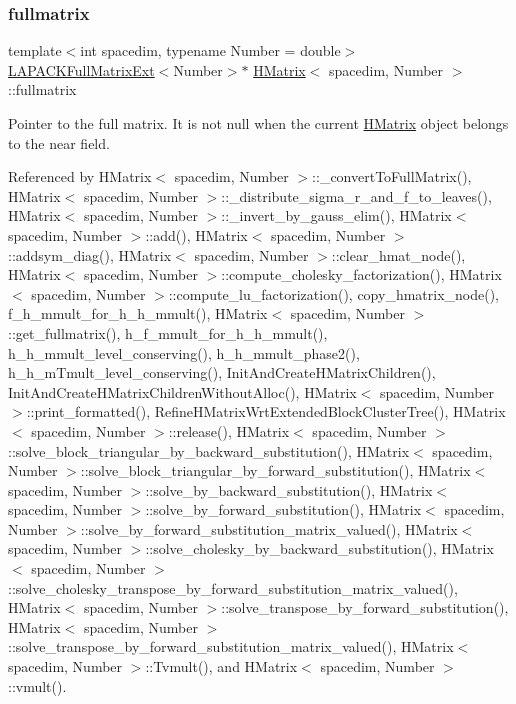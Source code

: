 \mbox{\label{classHMatrix_a328134c9e9cb2c4b05d5431c0ca8a533}} 
\subsubsection{\texorpdfstring{fullmatrix}{fullmatrix}}
{\footnotesize\ttfamily template$<$int spacedim, typename Number = double$>$ \\
\hyperlink{classLAPACKFullMatrixExt}{L\+A\+P\+A\+C\+K\+Full\+Matrix\+Ext}$<$Number$>$$\ast$ \hyperlink{classHMatrix}{H\+Matrix}$<$ spacedim, Number $>$\+::fullmatrix\hspace{0.3cm}{\ttfamily [private]}}

Pointer to the full matrix. It is not null when the current \hyperlink{classHMatrix}{H\+Matrix} object belongs to the near field. 

Referenced by H\+Matrix$<$ spacedim, Number $>$\+::\+\_\+convert\+To\+Full\+Matrix(), H\+Matrix$<$ spacedim, Number $>$\+::\+\_\+distribute\+\_\+sigma\+\_\+r\+\_\+and\+\_\+f\+\_\+to\+\_\+leaves(), H\+Matrix$<$ spacedim, Number $>$\+::\+\_\+invert\+\_\+by\+\_\+gauss\+\_\+elim(), H\+Matrix$<$ spacedim, Number $>$\+::add(), H\+Matrix$<$ spacedim, Number $>$\+::addsym\+\_\+diag(), H\+Matrix$<$ spacedim, Number $>$\+::clear\+\_\+hmat\+\_\+node(), H\+Matrix$<$ spacedim, Number $>$\+::compute\+\_\+cholesky\+\_\+factorization(), H\+Matrix$<$ spacedim, Number $>$\+::compute\+\_\+lu\+\_\+factorization(), copy\+\_\+hmatrix\+\_\+node(), f\+\_\+h\+\_\+mmult\+\_\+for\+\_\+h\+\_\+h\+\_\+mmult(), H\+Matrix$<$ spacedim, Number $>$\+::get\+\_\+fullmatrix(), h\+\_\+f\+\_\+mmult\+\_\+for\+\_\+h\+\_\+h\+\_\+mmult(), h\+\_\+h\+\_\+mmult\+\_\+level\+\_\+conserving(), h\+\_\+h\+\_\+mmult\+\_\+phase2(), h\+\_\+h\+\_\+m\+Tmult\+\_\+level\+\_\+conserving(), Init\+And\+Create\+H\+Matrix\+Children(), Init\+And\+Create\+H\+Matrix\+Children\+Without\+Alloc(), H\+Matrix$<$ spacedim, Number $>$\+::print\+\_\+formatted(), Refine\+H\+Matrix\+Wrt\+Extended\+Block\+Cluster\+Tree(), H\+Matrix$<$ spacedim, Number $>$\+::release(), H\+Matrix$<$ spacedim, Number $>$\+::solve\+\_\+block\+\_\+triangular\+\_\+by\+\_\+backward\+\_\+substitution(), H\+Matrix$<$ spacedim, Number $>$\+::solve\+\_\+block\+\_\+triangular\+\_\+by\+\_\+forward\+\_\+substitution(), H\+Matrix$<$ spacedim, Number $>$\+::solve\+\_\+by\+\_\+backward\+\_\+substitution(), H\+Matrix$<$ spacedim, Number $>$\+::solve\+\_\+by\+\_\+forward\+\_\+substitution(), H\+Matrix$<$ spacedim, Number $>$\+::solve\+\_\+by\+\_\+forward\+\_\+substitution\+\_\+matrix\+\_\+valued(), H\+Matrix$<$ spacedim, Number $>$\+::solve\+\_\+cholesky\+\_\+by\+\_\+backward\+\_\+substitution(), H\+Matrix$<$ spacedim, Number $>$\+::solve\+\_\+cholesky\+\_\+transpose\+\_\+by\+\_\+forward\+\_\+substitution\+\_\+matrix\+\_\+valued(), H\+Matrix$<$ spacedim, Number $>$\+::solve\+\_\+transpose\+\_\+by\+\_\+forward\+\_\+substitution(), H\+Matrix$<$ spacedim, Number $>$\+::solve\+\_\+transpose\+\_\+by\+\_\+forward\+\_\+substitution\+\_\+matrix\+\_\+valued(), H\+Matrix$<$ spacedim, Number $>$\+::\+Tvmult(), and H\+Matrix$<$ spacedim, Number $>$\+::vmult().

